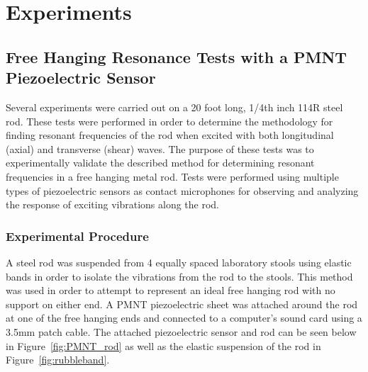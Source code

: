 \chapter{Experiments}
\section{Free Hanging Resonance Tests with a PMNT Piezoelectric Sensor}

Several experiments were carried out on a 20 foot long, 1/4th inch 114R steel rod. These tests were performed in order to determine the methodology for finding resonant frequencies of the rod when excited with both longitudinal (axial) and transverse (shear) waves. The purpose of these tests was to experimentally validate the described method for determining resonant frequencies in a free hanging metal rod. Tests were performed using multiple types of piezoelectric sensors as contact microphones for observing and analyzing the response of exciting vibrations along the rod. 

\subsection{Experimental Procedure}

A steel rod was suspended from 4 equally spaced laboratory stools using elastic bands in order to isolate the vibrations from the rod to the stools. This method was used in order to attempt to represent an ideal free hanging rod with no support on either end. A PMNT piezoelectric sheet was attached around the rod at one of the free hanging ends and connected to a computer’s sound card using a 3.5mm patch cable. The attached piezoelectric sensor and rod can be seen below in Figure~\ref{fig:PMNT_rod} as well as the elastic suspension of the rod in Figure~\ref{fig:rubbleband}.

